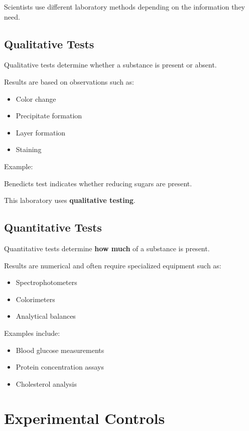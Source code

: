 \documentclass[
  letterpaper,
  DIV=11,
  numbers=noendperiod]{scrreprt}
\begin{document}
Scientists use different laboratory methods depending on the information
they need.

\subsection{\texorpdfstring{\textbf{Qualitative
Tests}}{Qualitative Tests}}\label{qualitative-tests}

Qualitative tests determine whether a substance is present or absent.

Results are based on observations such as:

\begin{itemize}
\item
  Color change
\item
  Precipitate formation
\item
  Layer formation
\item
  Staining
\end{itemize}

Example:

Benedict\textquotesingle s test indicates whether reducing sugars are
present.

This laboratory uses \textbf{qualitative testing}.

\subsection{\texorpdfstring{\textbf{Quantitative
Tests}}{Quantitative Tests}}\label{quantitative-tests}

Quantitative tests determine \textbf{how much} of a substance is
present.

Results are numerical and often require specialized equipment such as:

\begin{itemize}
\item
  Spectrophotometers
\item
  Colorimeters
\item
  Analytical balances
\end{itemize}

Examples include:

\begin{itemize}
\item
  Blood glucose measurements
\item
  Protein concentration assays
\item
  Cholesterol analysis
\end{itemize}

\section{\texorpdfstring{\textbf{Experimental
Controls}}{Experimental Controls}}\label{experimental-controls}
\end{document}
